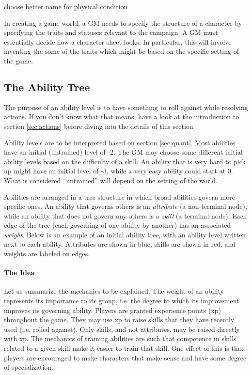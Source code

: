 \documentclass[12pt]{article}
\newcommand{\notes}[1]{{\color{Tan} #1}}
\begin{document}
\notes{choose better name for physical condition}



In creating a game world, a GM needs to specify the structure of a character by specifying the traits and statuses relevant to the campaign.
A GM must essentially decide how a character sheet looks.
In particular, this will involve inventing the some of the traits which might be based on the specific setting of the game.

\subsection{The Ability Tree}\label{sec:tree}			

The purpose of an ability level is to have something to roll against while resolving actions. If you don't know what that means, have a look at the introduction to section \ref{sec:actions} before diving into the details of this section.

Ability levels are to be interpreted based on section \ref{sec:quant}.
Most abilities have an initial (untrained) level of -2. The GM may choose some different initial ability levels based on the difficulty of a skill. An ability that is very hard to pick up might have an initial level of -3, while a very easy ability could start at 0. What is considered ``untrained'' will depend on the setting of the world.

Abilities are arranged in a tree structure in which broad abilities govern more specific ones.
An ability that governs others is an \emph{attribute} (a non-terminal node), while an ability that does not govern any others is a \emph{skill} (a terminal node).
Each edge of the tree (each governing of one ability by another) has an associated \emph{weight}.
Below is an example of an initial ability tree, with an ability level written next to each ability.
Attributes are shown in blue, skills are shown in red, and weights are labeled on edges.

\begin{center}

\end{center}

\paragraph{The Idea} Let us summarize the mechanics to be explained. The weight of an ability represents its importance to its group, i.e. the degree to which its improvement improves its governing ability.
Players are granted experience points (xp) throughout the game. They may use xp to raise skills that they have recently used (i.e. rolled against).
Only skills, and not attributes, may be raised directly with xp.
The mechanics of training abilities are such that competence in skills related to a given skill make it easier to train that skill.
One effect of this is that players are encouraged
to make characters that make sense and have some degree of specialization.
\end{document}
